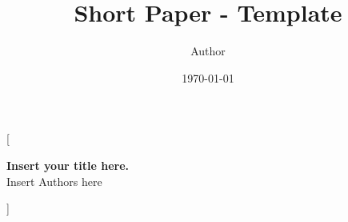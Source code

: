 \documentclass{article}
\title{Short Paper - Template}
\author{Author}
\date{\today}
\begin{document}
\twocolumn
[{
\LARGE
\textcolor{titleColor}{\textbf{Insert your title here.}}\vspace{1ex}\\
\large
\textcolor{authorColor}{Insert Authors here}
\vspace{1ex}
\normalsize
\begin{tcolorbox}[  colback = abstractColor,
                    ,
                    width=\linewidth,
                    arc=1mm, auto outer arc,
                ]
\justifying

\end{tcolorbox}
\vspace{1.5ex}
}]








\newpage

\onecolumn


\begin{appendices}

\end{appendices}
\end{document}
